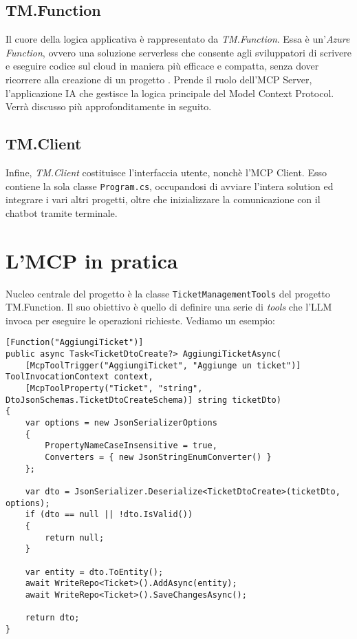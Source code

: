 \subsection{TM.Function}
Il cuore della logica applicativa è rappresentato da \textit{TM.Function}. Essa è un'\textit{Azure Function}, ovvero una soluzione serverless
che consente agli sviluppatori di scrivere e eseguire codice sul cloud in maniera più efficace e compatta, senza dover ricorrere alla 
creazione di un progetto \cite{azurefunctions_msdocs}. Prende il ruolo dell'MCP Server, l'applicazione IA che gestisce la logica principale del
Model Context Protocol. Verrà discusso più approfonditamente in seguito.

\subsection{TM.Client}
Infine, \textit{TM.Client} costituisce l'interfaccia utente, nonchè l'MCP Client. Esso contiene la sola classe \texttt{Program.cs}, occupandosi
di avviare l'intera solution ed integrare i vari altri progetti, oltre che inizializzare la comunicazione con il chatbot tramite terminale.

\newpage
\section{L'MCP in pratica}
Nucleo centrale del progetto è la classe \texttt{TicketManagementTools} del progetto TM.Function. Il suo obiettivo è quello di definire una serie
di \textit{tools} che l'LLM invoca per eseguire le operazioni richieste. Vediamo un esempio:

\begin{scriptsize}
\begin{verbatim}
[Function("AggiungiTicket")] 
public async Task<TicketDtoCreate?> AggiungiTicketAsync(
    [McpToolTrigger("AggiungiTicket", "Aggiunge un ticket")] ToolInvocationContext context,
    [McpToolProperty("Ticket", "string", DtoJsonSchemas.TicketDtoCreateSchema)] string ticketDto)
{
    var options = new JsonSerializerOptions
    {
        PropertyNameCaseInsensitive = true,
        Converters = { new JsonStringEnumConverter() }
    };

    var dto = JsonSerializer.Deserialize<TicketDtoCreate>(ticketDto, options);
    if (dto == null || !dto.IsValid())
    {
        return null;
    }

    var entity = dto.ToEntity();
    await WriteRepo<Ticket>().AddAsync(entity);
    await WriteRepo<Ticket>().SaveChangesAsync();

    return dto;
}
\end{verbatim}
\end{scriptsize}


